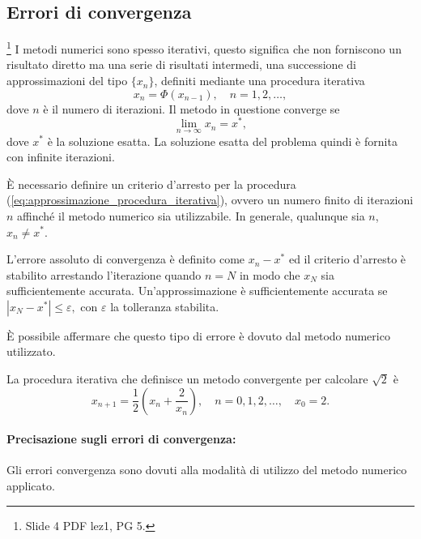 \subsection{Errori di convergenza}\label{ssec:errori_convergenza}
\footnote{Slide 4 PDF lez1, PG 5.} I metodi numerici sono spesso iterativi, questo significa che non forniscono un risultato diretto ma una serie di risultati intermedi, una successione di approssimazioni del tipo $\{x_n\}$, definiti mediante una procedura iterativa
\begin{equation}\label{eq:approssimazione_procedura_iterativa}
	x_n=\Phi(x_{n-1}),\quad n=1,2,\hdots,
\end{equation}
dove $n$ è il numero di iterazioni. Il metodo in questione converge se
\begin{equation}
	\lim_{n\rightarrow\infty}x_n=x^*,
\end{equation}
dove $x^*$ è la soluzione esatta. La soluzione esatta del problema quindi è fornita con infinite iterazioni.

È necessario definire un criterio d'arresto per la procedura (\ref{eq:approssimazione_procedura_iterativa}), ovvero un numero finito di iterazioni $n$ affinché il \gls{metodo numerico} sia utilizzabile. In generale, qualunque sia $n$, $x_n\neq x^*$.

L'errore assoluto di convergenza è definito come $x_n-x^*$ ed il criterio d'arresto è stabilito arrestando l'iterazione quando $n=N$ in modo che $x_N$ sia sufficientemente accurata. Un'approssimazione è sufficientemente accurata se $|x_N-x^*|\leq\varepsilon,$ con $\varepsilon$ la tolleranza stabilita.

È possibile affermare che questo tipo di errore è dovuto dal \gls{metodo numerico} utilizzato.

\begin{example}
	La procedura iterativa che definisce un metodo convergente per calcolare $\sqrt{2}$ è
	\begin{equation*}
		x_{n+1}=\frac{1}{2}\left(x_n+\frac{2}{x_n}\right),\quad n=0,1,2,\hdots,\quad x_0=2.
	\end{equation*}
\end{example}

\paragraph{Precisazione sugli errori di convergenza:} Gli errori convergenza sono dovuti alla modalità di utilizzo del \gls{metodo numerico} applicato.

